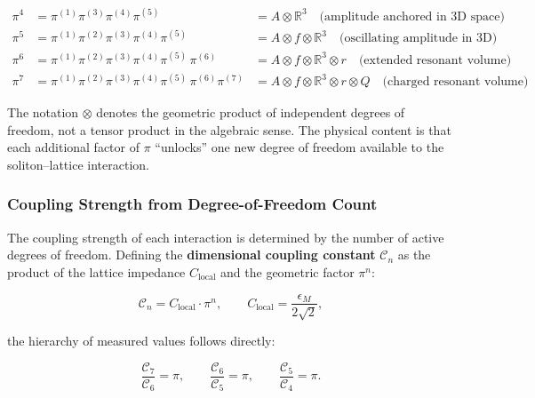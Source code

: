\documentclass[10pt,a4paper]{article}
\begin{document}
\begin{equation}
	\label{eq:ladder_dof}
	\begin{array}{lll}
		\pi^4 & = \pi^{(1)} \pi^{(3)}\pi^{(4)}\pi^{(5)} 
		& = A \otimes \mathbb{R}^3 
		\quad \text{(amplitude anchored in 3D space)} \\[4pt]
		\pi^5 & = \pi^{(1)} \pi^{(2)} \pi^{(3)}\pi^{(4)}\pi^{(5)} 
		& = A \otimes f \otimes \mathbb{R}^3 
		\quad \text{(oscillating amplitude in 3D)} \\[4pt]
		\pi^6 & = \pi^{(1)} \pi^{(2)} \pi^{(3)}\pi^{(4)}\pi^{(5)} \,
		\pi^{(6)} 
		& = A \otimes f \otimes \mathbb{R}^3 \otimes r 
		\quad \text{(extended resonant volume)} \\[4pt]
		\pi^7 & = \pi^{(1)} \pi^{(2)} \pi^{(3)}\pi^{(4)}\pi^{(5)} \,
		\pi^{(6)} \pi^{(7)} 
		& = A \otimes f \otimes \mathbb{R}^3 \otimes r \otimes Q 
		\quad \text{(charged resonant volume)}
	\end{array}
\end{equation}

\noindent The notation $\otimes$ denotes the geometric product of independent 
degrees of freedom, not a tensor product in the algebraic sense. The physical 
content is that each additional factor of $\pi$ ``unlocks'' one new degree of 
freedom available to the soliton--lattice interaction.

\subsubsection*{Coupling Strength from Degree-of-Freedom Count}

The coupling strength of each interaction is determined by the number of 
active degrees of freedom. Defining the \textbf{dimensional coupling constant} 
$\mathcal{C}_n$ as the product of the lattice impedance $C_{\text{local}}$ 
and the geometric factor $\pi^n$:

\begin{equation}
	\mathcal{C}_n = C_{\text{local}} \cdot \pi^n, 
	\qquad C_{\text{local}} = \frac{\epsilon_M}{2\sqrt{2}},
	\label{eq:coupling_constant}
\end{equation}

the hierarchy of measured values follows directly:

\begin{equation}
	\label{eq:coupling_hierarchy}
	\frac{\mathcal{C}_7}{\mathcal{C}_6} = \pi, \qquad
	\frac{\mathcal{C}_6}{\mathcal{C}_5} = \pi, \qquad
	\frac{\mathcal{C}_5}{\mathcal{C}_4} = \pi.
\end{equation}
\end{document}
